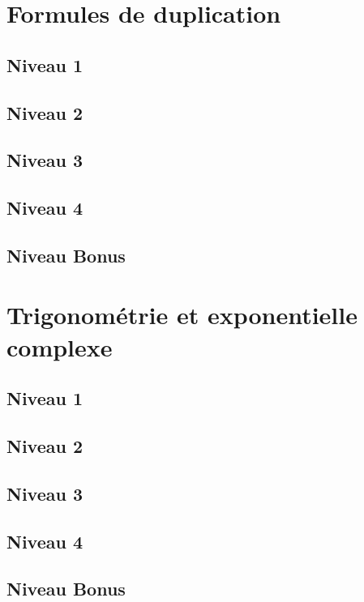 \documentclass[a4paper]{report}
\begin{document}
		\section{Formules de duplication}
		
			\subsection{Niveau 1}
		
			\subsection{Niveau 2}
		
			\subsection{Niveau 3}
			
			\subsection{Niveau 4}
			
			\subsection{Niveau Bonus}
		
		\section{Trigonométrie et exponentielle complexe}
		
			\subsection{Niveau 1}
		
			\subsection{Niveau 2}
		
			\subsection{Niveau 3}
			
			\subsection{Niveau 4}
			
			\subsection{Niveau Bonus}
		
\end{document}
